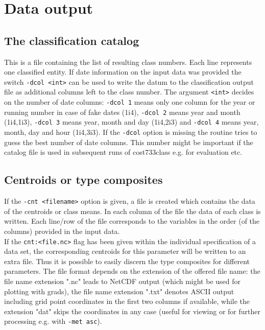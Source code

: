 \documentclass[12pt, oneside, a4paper, headsepline, plainheadsepline]{scrbook}
\begin{document}
\chapter{Data output}

\section{The classification catalog}
This is a file containing the list of resulting class numbers. Each line represents one
classified entity. If date information on
the input data was provided the switch \verb+-dcol <int>+  can be used
to write the datum to the classification output file
as additional columns left to the class number. The argument
\verb+<int>+ decides on the number of date columns:
\verb+-dcol 1+ means only one column for the year or running number in case of fake dates (1i4), \verb+-dcol 2+
means year and month (1i4,1i3), \verb+-dcol 3+
means year, month and day (1i4,2i3) and \verb+-dcol 4+ means year,
month, day and hour (1i4,3i3). If the \verb+-dcol+ option is missing the routine tries to guess 
the best number of date columns. This number might be important if the catalog file is used in subsequent 
runs of cost733class e.g. for evaluation etc.

\section{Centroids or type composites}

If the \verb+-cnt <filename>+ option is given, a file is created which contains the data of the
centroids or class means. In each column of the file the data of each class is written. Each line/row of the file 
corresponds to the variables in the order (of the columns) provided in the input data.\\
If the \verb+cnt:<file.nc>+ flag has been given within the individual specification of a data set,
the corresponding centroids for this parameter will be written to an extra file. Thus it is possible to 
easily discern the type composites for different parameters. The file format depends on the extension of the 
offered file name: the file name extension ".nc" leads to NetCDF output (which might be used for plotting with grads), 
the file name extension ".txt" denotes ASCII output including grid point coordinates in the first two columns if available,
while the extension "dat" skips the coordinates in any case (useful for viewing or for further processing e.g. with \verb+-met asc+).
\end{document}
